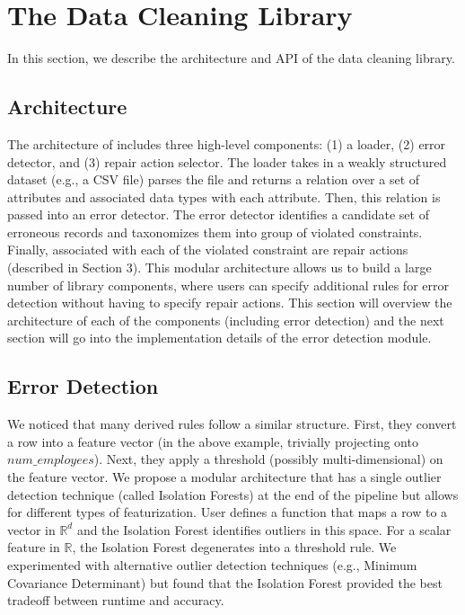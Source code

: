 \section{The Data Cleaning Library}
 In this section, we describe the architecture and API of the data cleaning library. 

\subsection{Architecture}
The architecture of \sys includes three high-level components: (1) a loader, (2) error detector, and (3) repair action selector.
The loader takes in a weakly structured dataset (e.g., a CSV file) parses the file and returns a relation over a set of attributes and associated data types with each attribute.
Then, this relation is passed into an error detector.
The error detector identifies a candidate set of erroneous records and taxonomizes them into group of violated constraints.
Finally, associated with each of the violated constraint are repair actions (described in Section 3).
This modular architecture allows us to build a large number of library components, where users can specify additional rules for error detection without having to specify repair actions.
This section will overview the architecture of each of the components (including error detection) and the next section will go into the implementation details of the error detection module.

\subsection{Error Detection}
We noticed that many derived rules follow a similar structure.
First, they convert a row into a feature vector (in the above example, trivially projecting onto $num\_employees$).
Next, they apply a threshold (possibly multi-dimensional) on the feature vector.
We propose a modular architecture that has a single outlier detection technique (called Isolation Forests) at the end of the pipeline but allows for different types of featurization.
User defines a function that maps a row to a vector in $\mathbb{R}^d$ and the Isolation Forest identifies outliers in this space.
For a scalar feature in $\mathbb{R}$, the Isolation Forest degenerates into a threshold rule. 
We experimented with alternative outlier detection techniques (e.g., Minimum Covariance Determinant) but found that the Isolation Forest provided the best tradeoff between runtime and accuracy.

